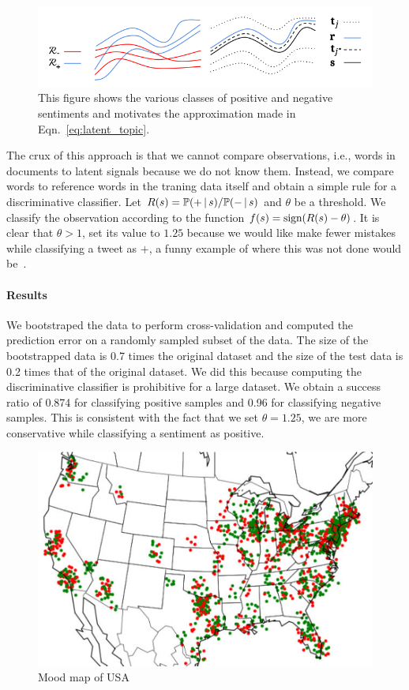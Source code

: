\documentclass[11pt, letterpaper, conference, final, twocolumn]{ieeeconf}
\begin{document}
\begin{figure}
\centering
\includegraphics[width=\columnwidth]{fig/latent_topics}
\caption{This figure shows the various classes of positive and negative sentiments and motivates the approximation made in Eqn.~\eqref{eq:latent_topic}.}
\label{fig:latent_topics}
\end{figure}

The crux of this approach is that we cannot compare observations, i.e., words in documents to latent signals because we do not know them. Instead, we compare words to reference words in the traning data itself and obtain a simple rule for a discriminative classifier. Let $R(s) = \mathbb{P}(+ \, \vert \, s)/\mathbb{P}(- \, \vert \, s)$ and $\theta$ be a threshold. We classify the observation according to the function $f(s) = \textrm{sign}(R(s) - \theta)$. It is clear that $\theta > 1$, set its value to $1.25$ because we would like make fewer mistakes while classifying a tweet as $+$, a funny example of where this was not done would be~\cite{target_pregnant}.

\paragraph{Results}
We bootstraped the data to perform cross-validation and computed the prediction error on a randomly sampled subset of the data. The size of the bootstrapped data is 0.7 times the original dataset and the size of the test data is 0.2 times that of the original dataset. We did this because computing the discriminative classifier is prohibitive for a large dataset. We obtain a success ratio of 0.874 for classifying positive samples and 0.96 for classifying negative samples. This is consistent with the fact that we set $\theta = 1.25$, we are more conservative while classifying a sentiment as positive.


\begin{figure}
\centering
\includegraphics[width=1.5 \columnwidth]{fig/map.pdf}
\caption{Mood map of USA}
\label{fig:map}
\end{figure}
\end{document}
